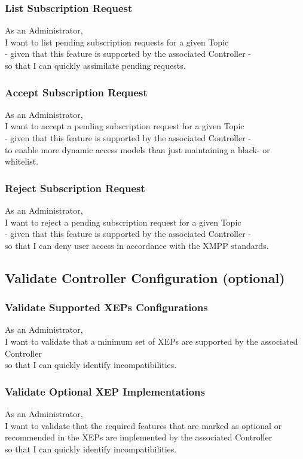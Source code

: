 \subsubsection{List Subscription Request}
As an Administrator,\\
I want to list pending subscription requests for a given Topic\\
- given that this feature is supported by the associated Controller -\\
so that I can quickly assimilate pending requests.

\subsubsection{Accept Subscription Request}

As an Administrator,\\
I want to accept a pending subscription request for a given Topic\\
- given that this feature is supported by the associated Controller -\\
to enable more dynamic access models than just maintaining a black- or whitelist.

\subsubsection{Reject Subscription Request}

As an Administrator,\\
I want to reject a pending subscription request for a given Topic\\
- given that this feature is supported by the associated Controller -\\
so that I can deny user access in accordance with the XMPP standards.


\subsection{Validate Controller Configuration (optional)}

\subsubsection{Validate Supported XEPs Configurations}
As an Administrator,\\
I want to validate that a minimum set of XEPs are supported by the associated Controller\\
so that I can quickly identify incompatibilities.

\subsubsection{Validate Optional XEP Implementations}
As an Administrator,\\
I want to validate that the required features that are marked as optional or recommended in the XEPs are implemented by the associated Controller\\
so that I can quickly identify incompatibilities.

